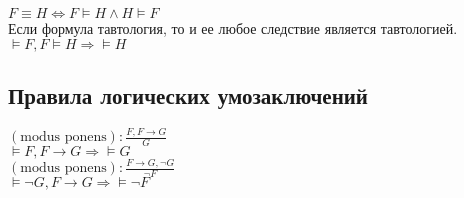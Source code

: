 \documentclass[letterpaper]{article}
\begin{document}
\(F \equiv H \iff F \models H \land H \models F\)\\

Если формула тавтология, то и ее любое следствие является тавтологией.\\
\(\models F, F \models H \Rightarrow \models H\)\\
\subsection{Правила логических умозаключений}
\label{sec:orgefd55a1}
\((\text{modus ponens}): \frac{F, F \rightarrow G}{G}\)\\
\(\models F, F \rightarrow G \Rightarrow \models G\)\\

\((\text{modus ponens}): \frac{F \rightarrow G, \neg{G}}{\neg{F}}\)\\
\(\models \neg{G}, F \rightarrow G \Rightarrow \models \neg{F}\)\\
\end{document}
